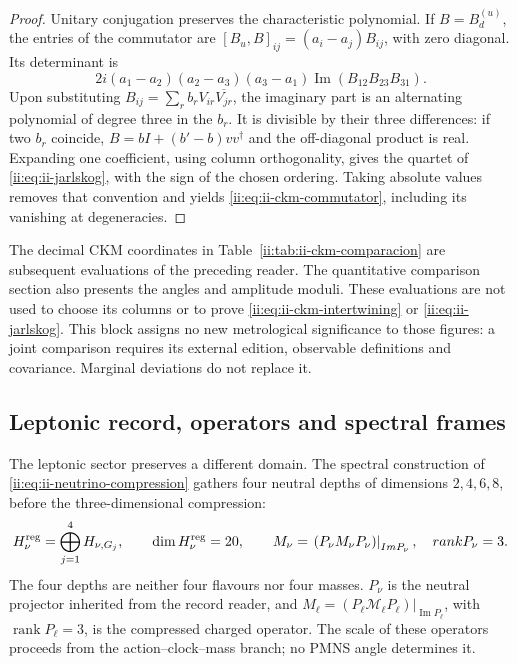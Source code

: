 \begin{proof}
Unitary conjugation preserves the characteristic polynomial. If \(B=B_d^{(u)}\), the entries of the commutator are \([B_u,B]_{ij}=(a_i-a_j)B_{ij}\), with zero diagonal. Its determinant is
\[
 2i(a_1-a_2)(a_2-a_3)(a_3-a_1)
     \operatorname{Im}(B_{12}B_{23}B_{31}).
\]
Upon substituting \(B_{ij}=\sum_r b_rV_{ir}\overline{V_{jr}}\), the imaginary part is an alternating polynomial of degree three in the \(b_r\). It is divisible by their three differences: if two \(b_r\) coincide, \(B=bI+(b'-b)vv^\dagger\) and the off-diagonal product is real. Expanding one coefficient, using column orthogonality, gives the quartet of \eqref{ii:eq:ii-jarlskog}, with the sign of the chosen ordering. Taking absolute values removes that convention and yields \eqref{ii:eq:ii-ckm-commutator}, including its vanishing at degeneracies.
\end{proof}

\begin{remark}
The decimal CKM coordinates in Table~\ref{ii:tab:ii-ckm-comparacion} are subsequent evaluations of the preceding reader. The quantitative comparison section also presents the angles and amplitude moduli. These evaluations are not used to choose its columns or to prove \eqref{ii:eq:ii-ckm-intertwining} or \eqref{ii:eq:ii-jarlskog}. This block assigns no new metrological significance to those figures: a joint comparison requires its external edition, observable definitions and covariance. Marginal deviations do not replace it.
\end{remark}

\subsection{Leptonic record, operators and spectral frames}

The leptonic sector preserves a different domain. The spectral construction of \eqref{ii:eq:ii-neutrino-compression} gathers four neutral depths of dimensions \(2,4,6,8\), before the three-dimensional compression:
\begin{equation}
 \mathcal H_\nu^{\rm reg}
 =\bigoplus_{j=1}^{4}\mathcal H_{\nu,G_j},\qquad
 \dim\mathcal H_\nu^{\rm reg}=20,\qquad
 M_\nu=\left.(P_\nu\mathcal M_\nu P_\nu)\right|_{\operatorname{Im}P_\nu},
 \quad\operatorname{rank}P_\nu=3.
 \label{ii:eq:ii-neutrino-compression}
\end{equation}
The four depths are neither four flavours nor four masses. \(P_\nu\) is the neutral projector inherited from the record reader, and \(M_\ell=\left.(P_\ell\mathcal M_\ell P_\ell)\right|_{\operatorname{Im}P_\ell}\), with \(\operatorname{rank}P_\ell=3\), is the compressed charged operator. The scale of these operators proceeds from the action--clock--mass branch; no PMNS angle determines it.

